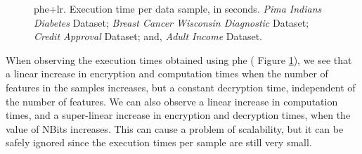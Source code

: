 \begin{figure}[hpt]
\caption[\acs{phe}+\acs{lr}. Execution time per data sample, in seconds. All datasets.]{\acs{phe}+\acs{lr}. Execution time per data sample, in seconds.
 \emph{Pima Indians Diabetes} Dataset;
 \emph{Breast Cancer Wisconsin Diagnostic} Dataset;
 \emph{Credit Approval} Dataset; and,
 \emph{Adult Income} Dataset.}%
\label{fig:lr-phe}%
\end{figure}


When observing the execution times obtained using \ac{phe} (
Figure \ref{fig:lr-phe}), we see that a linear increase in encryption and computation times when the number of features in the samples increases, but a constant decryption time, independent of the number of features.
We can also observe a linear increase in computation times, and a super-linear increase in encryption and decryption times, when the value of NBits increases. This can cause a problem of scalability, but it can be safely ignored since the execution times per sample are still very small.


